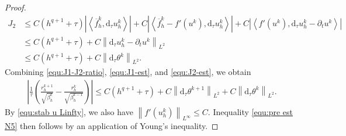 \documentclass[11pt, reqno]{amsart}
\theoremstyle{definition}
\numberwithin{equation}{section}
\newcommand{\dtt}{\mathrm{d}_\tau}
\newcommand{\norm}[2]{\left\|{#1}\right\|_{#2}}
\newcommand{\inpro}[2]{\left\langle#1,#2\right\rangle}
\newcommand{\abs}[1]{\left|{#1}\right|}
\begin{document}
\begin{proof}
\begin{align}
		J_2
		&\leq
		C(h^{q+1}+\tau)
		\abs{\inpro{\overline f_h^k}{\dtt u_h^k}}
		+
		C\abs{\inpro{\overline f_h^k-f'(u^k)}{\dtt u_h^k}}
		+
		C\abs{\inpro{f'(u^k)}{\dtt u_h^k-\partial_t u^k}}
		\nonumber\\
		&\leq
		C(h^{q+1}+\tau)
		+
		C\norm{\dtt u_h^k-\partial_t u^k}{L^2}
		\nonumber\\
		&\leq
		C(h^{q+1}+\tau)
		+
		C\norm{\dtt\theta^k}{L^2}.
		\label{equ:J2-est}
	\end{align}
	Combining \eqref{equ:J1-J2-ratio}, \eqref{equ:J1-est}, and
	\eqref{equ:J2-est}, we obtain
	\begin{align}
		\label{equ:ratio-pre-est}
		\abs{
			\frac{1}{\tau}
			\left(
			\frac{r_h^{k+1}}{\sqrt{\beta_h^k}}
			-
			\frac{r_h^k}{\sqrt{\beta_h^{k-1}}}
			\right)}
		\leq
		C(h^{q+1}+\tau)
		+
		C\norm{\dtt\theta^{k+1}}{L^2}
		+
		C\norm{\dtt\theta^k}{L^2}.
	\end{align}
	By \eqref{equ:stab u Linfty}, we also have
	$\norm{f'(u_h^k)}{L^\infty}\le C$. Inequality \eqref{equ:pre est N5} then follows by an application of Young's inequality.


\end{proof}
\end{document}
